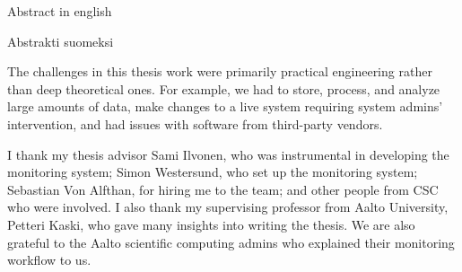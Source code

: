 \makecoverpage
\makecopyrightpage

\begin{abstractpage}[english]
Abstract in english
\end{abstractpage}

\begin{abstractpage}[finnish]
Abstrakti suomeksi
\end{abstractpage}

The challenges in this thesis work were primarily practical engineering rather than deep theoretical ones.
For example, we had to store, process, and analyze large amounts of data, make changes to a live system requiring system admins' intervention, and had issues with software from third-party vendors.

I thank my thesis advisor Sami Ilvonen, who was instrumental in developing the monitoring system; Simon Westersund, who set up the monitoring system; Sebastian Von Alfthan, for hiring me to the team; and other people from CSC who were involved.
I also thank my supervising professor from Aalto University, Petteri Kaski, who gave many insights into writing the thesis.
We are also grateful to the Aalto scientific computing admins who explained their monitoring workflow to us.
\newpage

\setcounter{tocdepth}{2}
\thesistableofcontents
